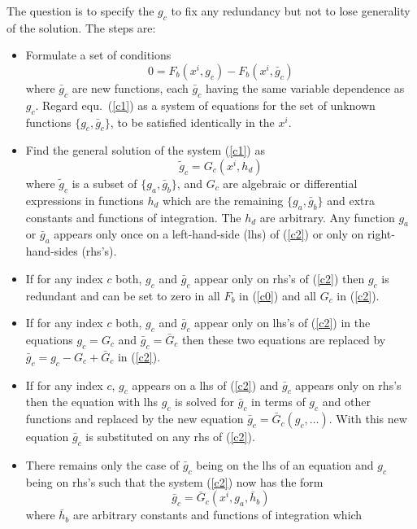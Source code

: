The question is to specify the $g_c$ to fix any redundancy but
not to lose generality of the solution. The steps are:
\begin{itemize}
\item Formulate a set of conditions 
\begin{equation}
 0 = F_b(x^i,g_c) - F_b(x^i,\bar{g}_c)     \label{c1}
\end{equation}
where $\bar{g}_c$ are new functions, each $\bar{g}_c$ having the same variable
dependence as $g_c$. Regard equ.\ (\ref{c1}) as a system
of equations for the set of unknown functions $\{g_c, \bar{g}_c\}$,
to be satisfied identically in the $x^i$.
\item Find the general solution of the system (\ref{c1}) as
\begin{equation}
\tilde{g}_c = G_c(x^i,h_d)  \label{c2}
\end{equation}
where $\tilde{g}_c$ is a subset of $\{g_a,\bar{g}_b\}$, and
$G_c$ are algebraic or differential expressions in functions
$h_d$ which are the remaining $\{g_a,\bar{g}_b\}$ and extra constants and functions
of integration. The $h_d$ are arbitrary. Any function $g_a$ or $\bar{g}_a$
appears only once on a left-hand-side (lhs) of (\ref{c2}) or only on 
right-hand-sides (rhs's).
\item
If for any index $c$ both, $g_c$ and $\bar{g}_c$ appear only on rhs's
of (\ref{c2}) then $g_c$ is redundant and can be set to zero in all $F_b$
in (\ref{c0}) and all $G_c$ in (\ref{c2}).
\item
If for any index $c$ both, $g_c$ and $\bar{g}_c$ appear only on 
lhs's of (\ref{c2}) in the equations $g_c=G_c$ and $\bar{g}_c=\bar{G}_c$
then these two equations are replaced by $\bar{g}_c = g_c-G_c+\bar{G}_c$ in (\ref{c2}).
\item
If for any index $c$, $g_c$ appears on a lhs of (\ref{c2}) 
and $\bar{g}_c$ appears only on rhs's then the equation with lhs $g_c$ is solved
for $\bar{g}_c$ in terms of $g_c$ and other functions and replaced by the
new equation $\bar{g}_c=\bar{G}_c(g_c,\ldots)$. With this new equation $\bar{g}_c$ is
substituted on any rhs of (\ref{c2}).
\item
There remains only the case of $\bar{g}_c$ being on the lhs of an equation
and $g_c$ being on rhs's such that the system (\ref{c2}) now has the form 
\begin{equation}
\bar{g}_c = \bar{G}_c(x^i,g_a,\bar{h}_b)    \label{c3}
\end{equation}
where $\bar{h}_b$ are arbitrary constants and functions of integration which

\end{itemize}

